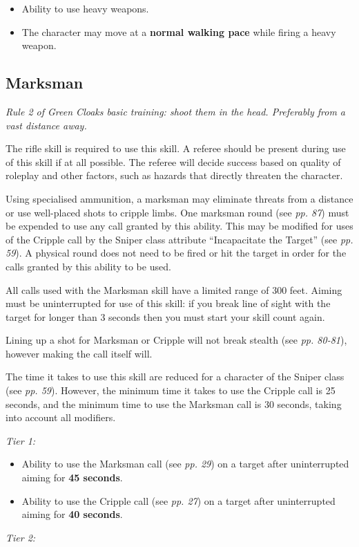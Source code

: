 \begin{itemize}
\item Ability to use heavy weapons.

\item The character may move at a \textbf{normal walking pace} while firing a heavy weapon.

\end{itemize}
\subsection{Marksman}

\textit{Rule 2 of Green Cloaks basic training: shoot them in the head. Preferably from a vast distance away.}

The rifle skill is required to use this skill. A referee should be present during use of this skill if at all possible. The referee will decide success based on quality of roleplay and other factors, such as hazards that directly threaten the character.

Using specialised ammunition, a marksman may eliminate threats from a distance or use well-placed shots to cripple limbs. One marksman round (see \textit{pp. 87}) must be expended to use any call granted by this ability. This may be modified for uses of the Cripple call by the Sniper class attribute ``Incapacitate the Target'' (see \textit{pp. 59}). A physical round does not need to be fired or hit the target in order for the calls granted by this ability to be used.

All calls used with the Marksman skill have a limited range of 300 feet. Aiming must be uninterrupted for use of this skill: if you break line of sight with the target for longer than 3 seconds then you must start your skill count again.

Lining up a shot for Marksman or Cripple will not break stealth (see \textit{pp. 80-81}), however making the call itself will.

The time it takes to use this skill are reduced for a character of the Sniper class (see \textit{pp. 59}). However, the minimum time it takes to use the Cripple call is 25 seconds, and the minimum time to use the Marksman call is 30 seconds, taking into account all modifiers.

\textit{Tier 1:}

\begin{itemize}
\item Ability to use the Marksman call (see \textit{pp. 29}) on a target after uninterrupted aiming for \textbf{45 seconds}.

\item Ability to use the Cripple call (see \textit{pp. 27}) on a target after uninterrupted aiming for \textbf{40 seconds}.

\end{itemize}
\textit{Tier 2:}

